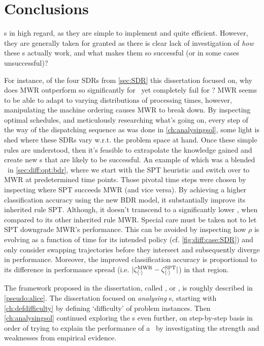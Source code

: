 
\chapter{Conclusions}\label{ch:conclusions} 
 \sdr s in high regard, as they 
are simple to implement and quite efficient. 
However, they are generally taken for granted as there is clear lack of 
investigation of \emph{how} these \dr s actually work, and what 
makes them so successful (or in some cases unsuccessful)? 

For instance, of the four SDRs from \cref{sec:SDR} this dissertation focused 
on, why does MWR outperform so significantly for \jsp\, yet completely fail for 
\fsp? 
MWR seems to be able to adapt to varying distributions of processing times, 
however, manipulating the machine ordering causes MWR to break down. 
By inspecting optimal schedules, and meticulously researching what's going on, 
every step of the way of the dispatching sequence as was done in 
\cref{ch:analysingsol}, some light is shed where these SDRs vary w.r.t. the 
problem space at hand. 
Once these simple rules are understood, then it's feasible to extrapolate the 
knowledge gained and create new \cdr s that are likely to be successful. 
An example of which was a blended \dr\ in \cref{sec:diff:opt:bdr}, where we 
start with the SPT heuristic and switch over to MWR at predetermined time 
points. Those pivotal time steps were chosen by inspecting where SPT succeeds 
MWR (and vice versa). 
By achieving a higher classification accuracy using the new BDR model, it 
substantially improve its inherited rule SPT.
Although, it doesn't transcend to a significantly lower \namerho, when compared 
to its other inherited rule MWR. 
Special care must be taken not to let SPT downgrade MWR's performance. This can 
be avoided by inspecting how $\rho$ is evolving as a function of time for its 
intended policy (cf. \cref{fig:diff:case:SDR}) and only consider swapping 
trajectories before they intersect and subsequently diverge in performance. 
Moreover, the improved classification accuracy is proportional to its 
difference in performance spread (i.e. 
$\lvert\zeta^{\text{MWR}}_{\langle \cdot \rangle} - \zeta^{\text{SPT}}_{\langle \cdot \rangle}\rvert$) in that region.



The framework proposed in the dissertation, called \fullnameAlice, or \Alice, 
is roughly described in \cref{pseudo:alice}. 
The dissertation focused on \emph{analysing} \sdr s, starting with 
\cref{ch:defdifficulty} by defining `difficulty' of problem instances. Then 
\cref{ch:analysingsol} continued exploring the \dr s even further, on  
step-by-step basis in order of trying to explain the performance 
of a \dr\ by investigating the strength and weaknesses from empirical evidence. 

